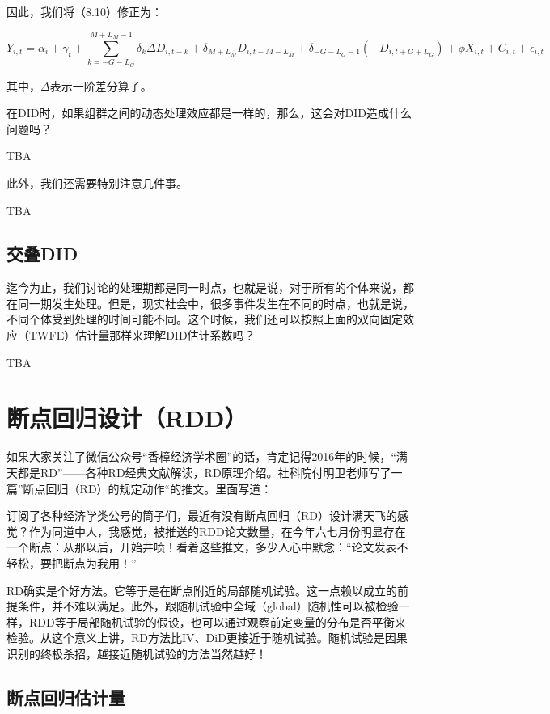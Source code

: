 \documentclass[cn,12pt,math=newtx,citestyle=gb7714-2015,bibstyle=gb7714-2015]{elegantbook}
\begin{document}
	因此，我们将（8.10）修正为：
	
		\begin{equation}
		Y_{i,t} = \alpha_i + \gamma_t + \sum_{k= -G-L_G}^{M+L_M-1} \delta_k \Delta D_{i,t-k} + \delta_{M+L_M}D_{i,t-M-L_M} + \delta_{-G-L_G-1}(-D_{i,t+G+L_G}) + \phi X_{i,t} + C_{i,t} + \epsilon_{i,t}
	\end{equation}
	
	其中，$\Delta$表示一阶差分算子。
	
	在DID时，如果组群之间的动态处理效应都是一样的，那么，这会对DID造成什么问题吗？
	
	TBA
	
	此外，我们还需要特别注意几件事。
	
	TBA
	
	
	\subsection{交叠DID}
	
	迄今为止，我们讨论的处理期都是同一时点，也就是说，对于所有的个体来说，都在同一期发生处理。但是，现实社会中，很多事件发生在不同的时点，也就是说，不同个体受到处理的时间可能不同。这个时候，我们还可以按照上面的双向固定效应（TWFE）估计量那样来理解DID估计系数吗？
	
	TBA
	
	
	
	\section{断点回归设计（RDD）}
	
	如果大家关注了微信公众号“香樟经济学术圈”的话，肯定记得2016年的时候，“满天都是RD”——各种RD经典文献解读，RD原理介绍。社科院付明卫老师写了一篇”断点回归（RD）的规定动作“的推文。里面写道：
	
	订阅了各种经济学类公号的筒子们，最近有没有断点回归（RD）设计满天飞的感觉？作为同道中人，我感觉，被推送的RDD论文数量，在今年六七月份明显存在一个断点：从那以后，开始井喷！看着这些推文，多少人心中默念：“论文发表不轻松，要把断点为我用！”
	
	RD确实是个好方法。它等于是在断点附近的局部随机试验。这一点赖以成立的前提条件，并不难以满足。此外，跟随机试验中全域（global）随机性可以被检验一样，RDD等于局部随机试验的假设，也可以通过观察前定变量的分布是否平衡来检验。从这个意义上讲，RD方法比IV、DiD更接近于随机试验。随机试验是因果识别的终极杀招，越接近随机试验的方法当然越好！
	
	\subsection{断点回归估计量}
	
\end{document}
